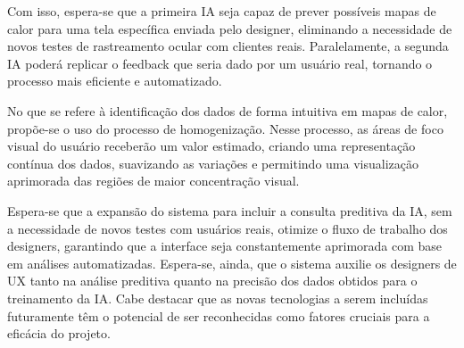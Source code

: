 Com isso, espera-se que a primeira IA seja capaz de prever possíveis mapas de calor para uma tela específica enviada pelo designer, eliminando a necessidade de novos testes de rastreamento ocular com clientes reais. Paralelamente, a segunda IA poderá replicar o feedback que seria dado por um usuário real, tornando o processo mais eficiente e automatizado.

No que se refere à identificação dos dados de forma intuitiva em mapas de calor, propõe-se o uso do processo de homogenização. Nesse processo, as áreas de foco visual do usuário receberão um valor estimado, criando uma representação contínua dos dados, suavizando as variações e permitindo uma visualização aprimorada das regiões de maior concentração visual.

Espera-se que a expansão do sistema para incluir a consulta preditiva da IA, sem a necessidade de novos testes com usuários reais, otimize o fluxo de trabalho dos designers, garantindo que a interface seja constantemente aprimorada com base em análises automatizadas. Espera-se, ainda, que o sistema auxilie os designers de UX tanto na análise preditiva quanto na precisão dos dados obtidos para o treinamento da IA. Cabe destacar que as novas tecnologias a serem incluídas futuramente têm o potencial de ser reconhecidas como fatores cruciais para a eficácia do projeto.